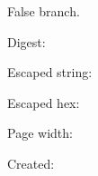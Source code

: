 \documentclass{article}
\begin{document}
\unless\iftrue False branch.\else True branch.\fi

Digest: 

Escaped string: 

Escaped hex: 

Page width: \the\pdfpagewidth

Created: \pdfcreationdate
\end{document}
